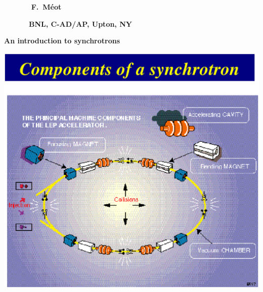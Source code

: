 \documentclass[12pt]{paper}
\begin{document}
\landscape


\sffamily


  
{
 ~~~~~~~ \hfill \large   \bf F.~M\'eot 

~~~~~~~\hfill \large   \bf BNL, C-AD/AP, Upton, NY
}

\begin{center} 
\Huge  
\bf 
An introduction to synchrotrons
\end{center} 




\clearpage


\begin{minipage}{.99\linewidth}
\centering

\includegraphics*[width=0.64\linewidth]{synch_components.eps}

\end{minipage}
\end{document}
